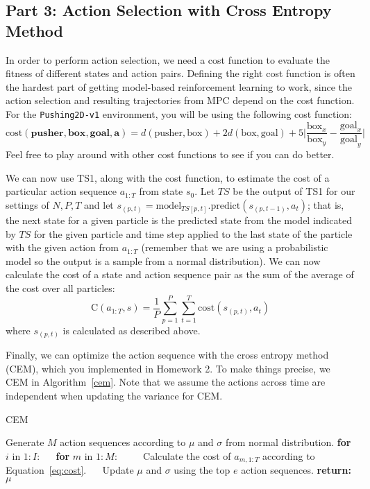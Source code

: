 \documentclass[12pt]{article}
\begin{document}
\subsection*{Part 3: Action Selection with Cross Entropy Method}
In order to perform action selection, we need a cost function to evaluate the fitness of different states and action pairs.  Defining the right cost function is often the hardest part of getting model-based reinforcement learning to work, since the action selection and resulting trajectories from MPC depend on the cost function.  For the \texttt{Pushing2D-v1} environment, you will be using the following cost function:
\begin{equation}
    \text{cost}(\textbf{pusher},\textbf{box},\textbf{goal},\textbf{a}) =d(\text{pusher}, \text{box}) + 2d(\text{box}, \text{goal}) + 5\Big|\frac{\text{box}_x}{\text{box}_y} - \frac{\text{goal}_x}{\text{goal}_y}\Big|
\end{equation}
Feel free to play around with other cost functions to see if you can do better.

We can now use TS1, along with the cost function, to estimate the cost of a particular action sequence $a_{1:T}$ from state $s_0$.  Let $TS$ be the output of TS1 for our settings of $N, P, T$ and let $s_{(p,t)} = \text{model}_{TS[p,t]}.\text{predict}(s_{(p, t-1)}, a_t)$; that is, the next state for a given particle is the predicted state from the model indicated by $TS$ for the given particle and time step applied to the last state of the particle with the given action from $a_{1:T}$ (remember that we are using a probabilistic model so the output is a sample from a normal distribution).    We can now calculate the cost of a state and action sequence pair as the sum of the average of the cost over all particles:
\begin{equation}\label{eq:cost}
    \text{C}(a_{1:T}, s) = \frac{1}{P}\sum_{p=1}^P\sum_{t=1}^T \text{cost}(s_{(p,t)},a_t) 
\end{equation}
where $s_{(p,t)}$ is calculated as described above.  

Finally, we can optimize the action sequence with the cross entropy method (CEM), which you implemented in Homework 2.  To make things precise, we CEM in Algorithm~\ref{cem}.  Note that we assume the actions across time are independent when updating the variance for CEM.
\begin{algorithm}
\caption{CEM\label{cem}}
\begin{algorithmic}[1]
\State Generate $M$ action sequences according to $\mu$ and $\sigma$ from normal distribution.
\State \textbf{for} $i$ in $1:I$:
\State $\quad$ \textbf{for} $m$ in $1:M$:
\State $\quad\quad$ Calculate the cost of $a_{m,1:T}$ according to Equation~\ref{eq:cost}.
\State $\quad$ Update $\mu$ and $\sigma$ using the top $e$ action sequences.  
\State \textbf{return:} $\mu$
\EndProcedure
\end{algorithmic}
\end{algorithm}
\end{document}
